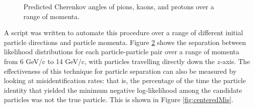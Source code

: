 \begin{figure}[]
\centering
{}
\caption[Predicted Cherenkov angles of pions, kaons, and protons over a range of momenta.]{Predicted Cherenkov angles of pions, kaons, and protons over a range of momenta.}
\label{fig:changles}
\end{figure}



A script was written to automate this procedure over a range of different initial particle directions and particle momenta. 
Figure \ref{fig:centeredSeps} shows the separation between likelihood distributions for each particle-particle pair over a range of momenta from 6 GeV/c to 14 GeV/c, with particles travelling directly down the $z$-axis.
The effectiveness of this technique for particle separation can also be measured by looking at misidentification rates: that is, the percentage of the time the particle identity that yielded the minimum negative log-likelihood among the candidate particles was not the true particle.
This is shown in Figure \ref{fig:centeredMis}.

\begin{figure}[]
\centering
{}
\caption[\TODO{}]{}
\label{fig:centeredSeps} 
\end{figure}

